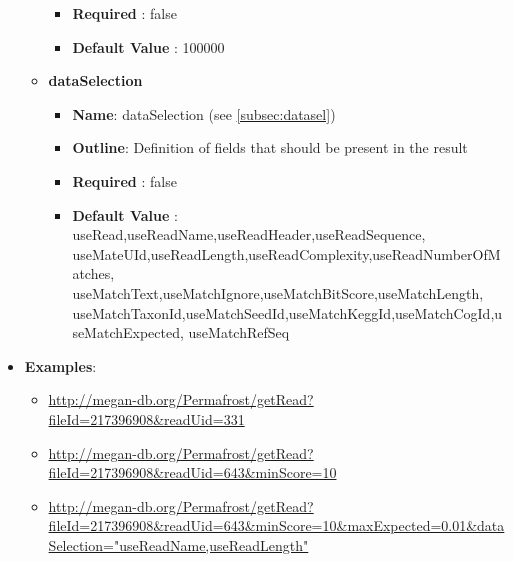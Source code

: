 \documentclass[11pt]{article}
\begin{document}
\begin{itemize}
\begin{itemize}
\begin{itemize}
					\item \textbf{Required} : false
					\item \textbf{Default Value} : 100000
				\end{itemize}
			\item \textbf{dataSelection}		
				\begin{itemize}
					\item \textbf{Name}: dataSelection (see \ref{subsec:datasel})
					\item \textbf{Outline}: Definition of fields that should be present in the result
					\item \textbf{Required} : false
					\item \textbf{Default Value} : useRead,useReadName,useReadHeader,useReadSequence, useMateUId,useReadLength,useReadComplexity,useReadNumberOfMatches, useMatchText,useMatchIgnore,useMatchBitScore,useMatchLength, useMatchTaxonId,useMatchSeedId,useMatchKeggId,useMatchCogId,useMatchExpected, useMatchRefSeq
				\end{itemize}
		\end{itemize}
	\item \textbf{Examples}:
		\begin{itemize}		
			\item \url{http://megan-db.org/Permafrost/getRead?fileId=217396908&readUid=331}
			\item \url{http://megan-db.org/Permafrost/getRead?fileId=217396908&readUid=643&minScore=10}
			\item \url{http://megan-db.org/Permafrost/getRead?fileId=217396908&readUid=643&minScore=10&maxExpected=0.01&dataSelection="useReadName,useReadLength"}
		\end{itemize}
\end{itemize}
\end{document}
